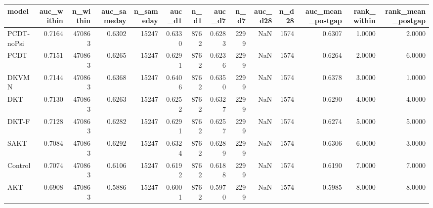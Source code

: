\begin{tabular}{lrrrrrrrrrrrrr}
\toprule
model & auc\_within & n\_within & auc\_sameday & n\_sameday & auc\_d1 & n\_d1 & auc\_d7 & n\_d7 & auc\_d28 & n\_d28 & auc\_mean\_postgap & rank\_within & rank\_mean\_postgap \\
\midrule
PCDT-noPsi & 0.7164 & 470863 & 0.6302 & 15247 & 0.6330 & 8762 & 0.6283 & 2299 & NaN & 1574 & 0.6307 & 1.0000 & 2.0000 \\
PCDT & 0.7151 & 470863 & 0.6265 & 15247 & 0.6291 & 8762 & 0.6236 & 2299 & NaN & 1574 & 0.6264 & 2.0000 & 6.0000 \\
DKVMN & 0.7144 & 470863 & 0.6368 & 15247 & 0.6406 & 8762 & 0.6350 & 2299 & NaN & 1574 & 0.6378 & 3.0000 & 1.0000 \\
DKT & 0.7130 & 470863 & 0.6263 & 15247 & 0.6252 & 8762 & 0.6327 & 2299 & NaN & 1574 & 0.6290 & 4.0000 & 4.0000 \\
DKT-F & 0.7128 & 470863 & 0.6282 & 15247 & 0.6291 & 8762 & 0.6257 & 2299 & NaN & 1574 & 0.6274 & 5.0000 & 5.0000 \\
SAKT & 0.7084 & 470863 & 0.6292 & 15247 & 0.6324 & 8762 & 0.6289 & 2299 & NaN & 1574 & 0.6306 & 6.0000 & 3.0000 \\
Control & 0.7074 & 470863 & 0.6106 & 15247 & 0.6192 & 8762 & 0.6188 & 2299 & NaN & 1574 & 0.6190 & 7.0000 & 7.0000 \\
AKT & 0.6908 & 470863 & 0.5886 & 15247 & 0.6001 & 8762 & 0.5970 & 2299 & NaN & 1574 & 0.5985 & 8.0000 & 8.0000 \\
\bottomrule
\end{tabular}
